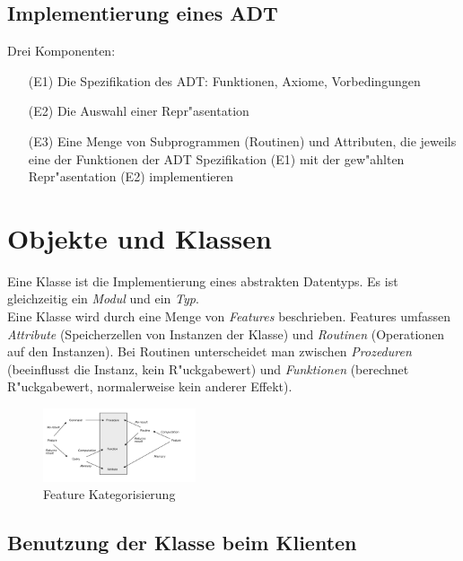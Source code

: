 \documentclass[german, 10pt, a4paper, twocolumn]{scrartcl}
\theoremstyle{definition}
\begin{document}
\subsection{Implementierung eines ADT}

Drei Komponenten:
\begin{enumerate}
	\item[(E1)] Die Spezifikation des ADT: Funktionen, Axiome, Vorbedingungen
	\item[(E2)] Die Auswahl einer Repr"asentation
	\item[(E3)] Eine Menge von Subprogrammen (Routinen) und Attributen, die jeweils eine der Funktionen der ADT Spezifikation (E1) mit der gew"ahlten Repr"asentation (E2) implementieren
\end{enumerate}

\section{Objekte und Klassen}

Eine Klasse ist die Implementierung eines abstrakten Datentyps. Es ist gleichzeitig ein \textit{Modul} und ein \textit{Typ}.\\

Eine Klasse wird durch eine Menge von \textit{Features} beschrieben. Features umfassen \textit{Attribute} (Speicherzellen von Instanzen der Klasse) und \textit{Routinen} (Operationen auf den Instanzen). Bei Routinen unterscheidet man zwischen \textit{Prozeduren} (beeinflusst die Instanz, kein R"uckgabewert) und \textit{Funktionen} (berechnet R"uckgabewert, normalerweise kein anderer Effekt).

\begin{figure}[htb]
 \begin{center}
	\includegraphics[width=0.4\textwidth]{feature_cat}
 \end{center}
 \caption{Feature Kategorisierung}
\end{figure}

\subsection{Benutzung der Klasse beim Klienten}
\end{document}
